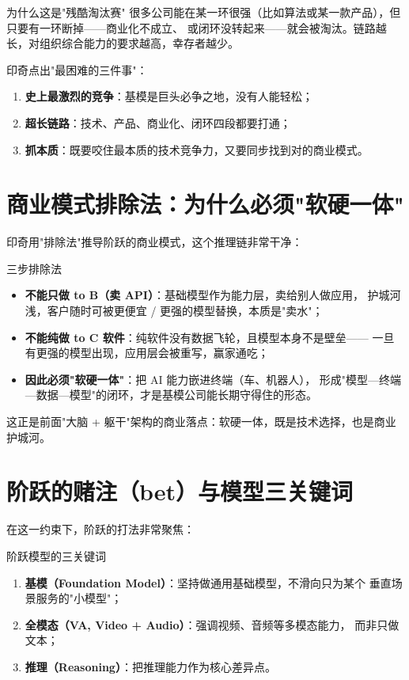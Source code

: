 \documentclass[a4paper]{article}
\begin{document}
\begin{warningbox}{为什么这是"残酷淘汰赛"}
很多公司能在某一环很强（比如算法或某一款产品），但只要有一环断掉——商业化不成立、
或闭环没转起来——就会被淘汰。链路越长，对组织综合能力的要求越高，幸存者越少。
\end{warningbox}

印奇点出"最困难的三件事"：
\begin{enumerate}
    \item \textbf{史上最激烈的竞争}：基模是巨头必争之地，没有人能轻松；
    \item \textbf{超长链路}：技术、产品、商业化、闭环四段都要打通；
    \item \textbf{抓本质}：既要咬住最本质的技术竞争力，又要同步找到对的商业模式。
\end{enumerate}

\section{商业模式排除法：为什么必须"软硬一体"}

印奇用"排除法"推导阶跃的商业模式，这个推理链非常干净：

\begin{knowledgebox}{三步排除法}
\begin{itemize}
    \item \textbf{不能只做 to B（卖 API）}：基础模型作为能力层，卖给别人做应用，
        护城河浅，客户随时可被更便宜 / 更强的模型替换，本质是"卖水"；
    \item \textbf{不能纯做 to C 软件}：纯软件没有数据飞轮，且模型本身不是壁垒——
        一旦有更强的模型出现，应用层会被重写，赢家通吃；
    \item \textbf{因此必须"软硬一体"}：把 AI 能力嵌进终端（车、机器人），
        形成"模型—终端—数据—模型"的闭环，才是基模公司能长期守得住的形态。
\end{itemize}
\end{knowledgebox}

这正是前面"大脑 + 躯干"架构的商业落点：软硬一体，既是技术选择，也是商业护城河。

\section{阶跃的赌注（bet）与模型三关键词}

在这一约束下，阶跃的打法非常聚焦：

\begin{importantbox}{阶跃模型的三关键词}
\begin{enumerate}
    \item \textbf{基模（Foundation Model）}：坚持做通用基础模型，不滑向只为某个
        垂直场景服务的"小模型"；
    \item \textbf{全模态（VA, Video + Audio）}：强调视频、音频等多模态能力，
        而非只做文本；
    \item \textbf{推理（Reasoning）}：把推理能力作为核心差异点。
\end{enumerate}
\end{importantbox}
\end{document}
